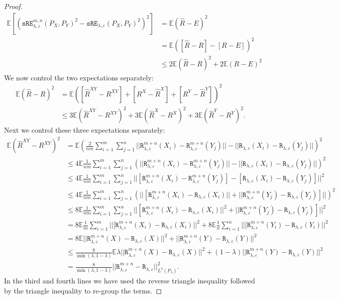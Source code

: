 \documentclass{article}
\theoremstyle{definition}
\newcommand{\sR}{\mathtt{R}_{\lambda,\varepsilon}}
\newcommand{\sRn}{\mathtt{R}_{\lambda,\varepsilon}^{m+n}}
\newcommand{\sRE}{\mathtt{sRE}_{\lambda,\varepsilon}}
\newcommand{\sREn}{\mathtt{sRE}_{\lambda, \varepsilon}^{m,n}}
\begin{document}
\begin{proof}
\begin{align*}
        \mathbb{E} \left [ \left ( \sREn(P_X, P_Y)^2 - \sRE(P_X,P_Y)^2 \right )^2 \right ]  &= \mathbb{E} ( \hat{R} - E )^2 \\
        &= \mathbb{E} ( [\hat{R} - R] - [R - E])^2 \\
        &\leq 2\mathbb{E} (\hat{R} - R)^2 + 2\mathbb{E}(R - E)^2
    \end{align*}
    We now control the two expectations separately:
    \begin{align*}
        \mathbb{E}(\hat{R} - R)^2 &= \mathbb{E} \left ( [\hat{R}^{XY} - R^{XY}] + [R^X - \hat{R}^X] + [R^Y - \hat{R}^Y] \right )^2 \\
        &\leq 3\mathbb{E}(\hat{R}^{XY} - R^{XY})^2 + 3\mathbb{E}(\hat{R}^{X} - R^{X})^2 + 3\mathbb{E}(\hat{R}^{Y} - R^{Y})^2.
    \end{align*}
    Next we control these three expectations separately:
    \begin{align*}
        \mathbb{E}(\hat{R}^{XY} - R^{XY})^2 &= \mathbb{E} \left (\frac{2}{nm}\sum_{i=1}^m\sum_{j=1}^n||\sRn(X_i) - \sRn(Y_j)|| - ||\sR(X_i) - \sR(Y_j)||  \right )^2 \\
        &\leq 4 \mathbb{E} \frac{1}{nm}\sum_{i=1}^m\sum_{j=1}^n\left ( ||\sRn(X_i) - \sRn(Y_j)|| - ||\sR(X_i) - \sR(Y_j)|| \right )^2 \\
        &\leq 4 \mathbb{E} \frac{1}{nm}\sum_{i=1}^m\sum_{j=1}^n ||[\sRn(X_i) - \sRn(Y_j)] - [\sR(X_i) - \sR(Y_j)]||^2 \\
        &\leq 4 \mathbb{E} \frac{1}{nm}\sum_{i=1}^m\sum_{j=1}^n \left (||[\sRn(X_i) - \sR(X_i)|| + ||\sRn(Y_j) - \sR(Y_j)]||\right )^2 \\
        &\leq 8 \mathbb{E} \frac{1}{nm}\sum_{i=1}^m\sum_{j=1}^n ||[\sRn(X_i) - \sR(X_i)||^2 + ||\sRn(Y_j) - \sR(Y_j)]||^2 \\
        &= 8 \mathbb{E} \frac{1}{m} \sum_{i=1}^m ||[\sRn(X_i) - \sR(X_i)||^2 + 8 \mathbb{E} \frac{1}{n} \sum_{i=1}^n ||[\sRn(Y_i) - \sR(Y_i)||^2 \\
        &= 8\mathbb{E} ||\sRn(X) - \sR(X)||^2 + ||\sRn(Y) - \sR(Y)||^2 \\
        &\leq \frac{8}{\min(\lambda, 1-\lambda)} \mathbb{E} \lambda||\sRn(X) - \sR(X)||^2 + (1-\lambda)||\sRn(Y) - \sR(Y)||^2 \\
        &= \frac{8}{\min(\lambda, 1-\lambda)} ||\sRn - \sR||_{L^2(P_\lambda)}^2.
    \end{align*}
    In the third and fourth lines we have used the reverse triangle inequality followed by the triangle inequality to re-group the terms. 

\end{proof}
\end{document}
